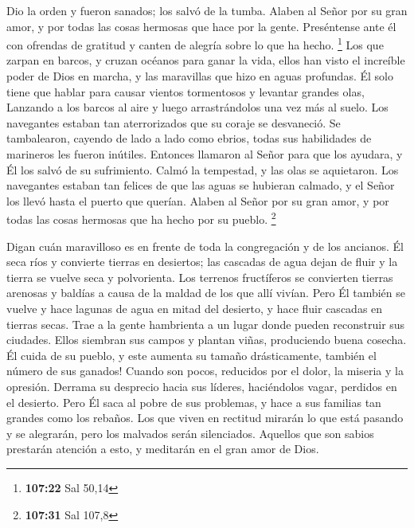  Dio la orden y fueron sanados; los salvó de la tumba.
 Alaben al Señor por su gran amor, y por todas las cosas
hermosas que hace por la gente.  Preséntense ante él con
ofrendas de gratitud y canten de alegría sobre lo que ha hecho.
\footnote{\textbf{107:22} Sal 50,14}  Los que zarpan en
barcos, y cruzan océanos para ganar la vida,  ellos han
visto el increíble poder de Dios en marcha, y las maravillas que hizo en
aguas profundas.  Él solo tiene que hablar para causar
vientos tormentosos y levantar grandes olas,  Lanzando a
los barcos al aire y luego arrastrándolos una vez más al suelo. Los
navegantes estaban tan aterrorizados que su coraje se desvaneció.
 Se tambalearon, cayendo de lado a lado como ebrios, todas
sus habilidades de marineros les fueron inútiles.  Entonces
llamaron al Señor para que los ayudara, y Él los salvó de su
sufrimiento.  Calmó la tempestad, y las olas se aquietaron.
 Los navegantes estaban tan felices de que las aguas se
hubieran calmado, y el Señor los llevó hasta el puerto que querían.
 Alaben al Señor por su gran amor, y por todas las cosas
hermosas que ha hecho por su pueblo. \footnote{\textbf{107:31} Sal 107,8}

 Digan cuán maravilloso es en frente de toda la
congregación y de los ancianos.  Él seca ríos y convierte
tierras en desiertos; las cascadas de agua dejan de fluir y la tierra se
vuelve seca y polvorienta.  Los terrenos fructíferos se
convierten tierras arenosas y baldías a causa de la maldad de los que
allí vivían.  Pero Él también se vuelve y hace lagunas de
agua en mitad del desierto, y hace fluir cascadas en tierras secas.
 Trae a la gente hambrienta a un lugar donde pueden
reconstruir sus ciudades.  Ellos siembran sus campos y
plantan viñas, produciendo buena cosecha.  Él cuida de su
pueblo, y este aumenta su tamaño drásticamente, también el número de sus
ganados!  Cuando son pocos, reducidos por el dolor, la
miseria y la opresión.  Derrama su desprecio hacia sus
líderes, haciéndolos vagar, perdidos en el desierto.  Pero
Él saca al pobre de sus problemas, y hace a sus familias tan grandes
como los rebaños.  Los que viven en rectitud mirarán lo que
está pasando y se alegrarán, pero los malvados serán silenciados.
 Aquellos que son sabios prestarán atención a esto, y
meditarán en el gran amor de Dios.

